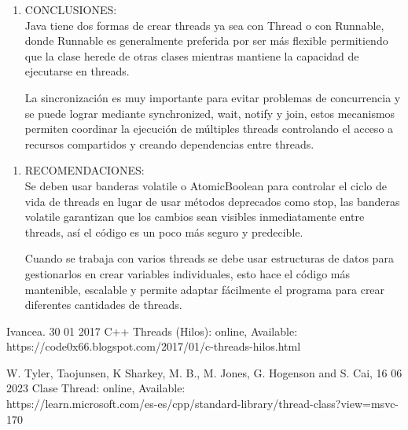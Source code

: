 \documentclass[a4paper]{article}
\newcommand{\tableCellPadding}{3pt}
\newcommand{\enumerateFirstMargin}{1.5em}
\newcommand{\betweenSectionsSpace}{\vspace{1.5\baselineskip}}
\renewcommand{\texttt}[1]{{\color{linkblue}\fontsize{8.5pt}{12pt}\selectfont\fontspec{Lato}\mbox{#1}}}
\newcommand{\tableContentsFont}{\fontsize{8.5pt}{12pt}\selectfont\mdseries}
\newcommand{\tableContentsFontBold}{\fontsize{8.5pt}{12pt}\selectfont\bfseries}
\begin{document}
\noindent
\begin{tcolorbox}[tabletcolorbox={CONCLUSIONES Y RECOMENDACIONES}]
  \vspace{\tableCellPadding}
  \tableContentsFontBold
  \begin{enumerate}[nosep, leftmargin=\enumerateFirstMargin, series=conclusions]
    \item CONCLUSIONES: \\
      \tableContentsFont Java tiene dos formas de crear threads ya sea con Thread o con Runnable, donde Runnable es generalmente preferida por ser más flexible permitiendo que la clase herede de otras clases mientras mantiene la capacidad de ejecutarse en threads.
      
      \tableContentsFont La sincronización es muy importante para evitar problemas de concurrencia y se puede lograr mediante synchronized, wait, notify y join, estos mecanismos permiten coordinar la ejecución de múltiples threads controlando el acceso a recursos compartidos y creando dependencias entre threads.
  \end{enumerate}
  
  \tcbline
  
  \tableContentsFontBold
  \begin{enumerate}[nosep, leftmargin=\enumerateFirstMargin, resume=conclusions]
    \item RECOMENDACIONES: \\
      \tableContentsFont Se deben usar banderas volatile o AtomicBoolean para controlar el ciclo de vida de threads en lugar de usar métodos deprecados como stop, las banderas volatile garantizan que los cambios sean visibles inmediatamente entre threads, así el código es un poco más seguro y predecible.
      
      \tableContentsFont Cuando se trabaja con varios threads se debe usar estructuras de datos para gestionarlos en crear variables individuales, esto hace el código más mantenible, escalable y permite adaptar fácilmente el programa para crear diferentes cantidades de threads.
  \end{enumerate}
\end{tcolorbox}

\betweenSectionsSpace

\noindent
\begin{tcolorbox}[tabletcolorbox={REFERENCIAS Y BIBLIOGRAFÍA}]
  \vspace{\tableCellPadding}
  \tableContentsFont [1] Ivancea. 30 01 2017 C++ Threads (Hilos): online, Available: \\
  \texttt{https://code0x66.blogspot.com/2017/01/c-threads-hilos.html}
  
  \tableContentsFont [2] W. Tyler, Taojunsen, K Sharkey, M. B., M. Jones, G. Hogenson and S. Cai, 16 06 2023 Clase Thread: online, Available: \\
  \texttt{https://learn.microsoft.com/es-es/cpp/standard-library/thread-class?view=msvc-170}
\end{tcolorbox}
\end{document}
